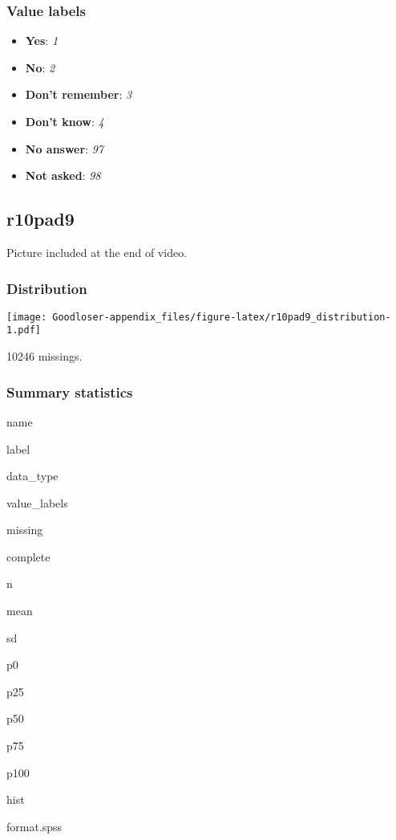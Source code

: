 \documentclass[]{book}
\providecommand{\tightlist}{%
  \setlength{\itemsep}{0pt}\setlength{\parskip}{0pt}}
\begin{document}
\subsubsection{Value labels}\label{r10pad8_labels}

\begin{itemize}
\tightlist
\item
  \textbf{Yes}: \emph{1}
\item
  \textbf{No}: \emph{2}
\item
  \textbf{Don't remember}: \emph{3}
\item
  \textbf{Don't know}: \emph{4}
\item
  \textbf{No answer}: \emph{97}
\item
  \textbf{Not asked}: \emph{98}
\end{itemize}

\subsection{r10pad9}\label{r10pad9}

Picture included at the end of video.

\subsubsection{Distribution}\label{r10pad9_distribution}

\texttt{[image: Goodloser-appendix\_files/figure-latex/r10pad9\_distribution-1.pdf]}

10246 missings.

\subsubsection{Summary statistics}\label{r10pad9_summary}

name

label

data\_type

value\_labels

missing

complete

n

mean

sd

p0

p25

p50

p75

p100

hist

format.spss
\end{document}
